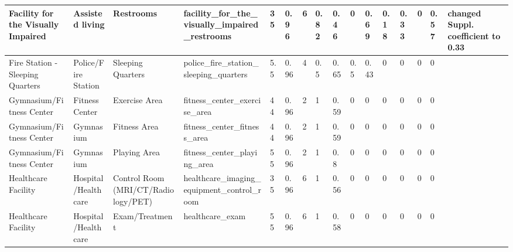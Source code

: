 \begin{center}
\begin{landscape}
\begin{longtable}{|p{0.75in}|p{0.75in}|p{0.75in}|p{0.75in}|p{0.3in}|p{0.3in}|p{0.3in}|p{0.3in}|p{0.3in}|p{0.3in}|p{0.3in}|p{0.3in}|p{0.3in}|p{0.3in}|p{0.3in}|p{0.6in}|}
      Facility for the Visually Impaired      & Assisted living             & Restrooms                                       & facility\_for\_the\_visually\_impaired\_restrooms               & 35   & 0.96 & 6  & 0.82   & 0.46  & 0     & 0.69  & 0.18 & 0.33 & 0    & 0.57 & changed Suppl. coefficient to 0.33                                              \\ \hline
      Fire Station - Sleeping Quarters        & Police/Fire Station         & Sleeping Quarters                               & police\_fire\_station\_sleeping\_quarters                       & 5.5  & 0.96 & 4  & 0.5    & 0.65  & 0.5   & 0.43  & 0    & 0    & 0    & 0    &                                                                                       \\ \hline
      Gymnasium/Fitness Center              & Fitness Center              & Exercise Area                                   & fitness\_center\_exercise\_area                                 & 44   & 0.96 & 2  & 1      & 0.59  & 0     & 0     & 0    & 0    & 0    & 0    &                                                                                       \\ \hline
      Gymnasium/Fitness Center              & Gymnasium                   & Fitness Area                                    & fitness\_center\_fitness\_area                                  & 44   & 0.96 & 2  & 1      & 0.59  & 0     & 0     & 0    & 0    & 0    & 0    &                                                                                       \\ \hline
      Gymnasium/Fitness Center              & Gymnasium                   & Playing Area                                    & fitness\_center\_playing\_area                                  & 55   & 0.96 & 2  & 1      & 0.8   & 0     & 0     & 0    & 0    & 0    & 0    &                                                                                       \\ \hline
      Healthcare Facility                     & Hospital/Healthcare         & Control Room (MRI/CT/Radiology/PET)       & healthcare\_imaging\_equipment\_control\_room                   & 35   & 0.96 & 6  & 1      & 0.56  & 0     & 0     & 0    & 0    & 0    & 0    &                                                                                       \\ \hline
      Healthcare Facility                     & Hospital/Healthcare         & Exam/Treatment                                  & healthcare\_exam                                                & 55   & 0.96 & 6  & 1      & 0.58  & 0     & 0     & 0    & 0    & 0    & 0    &                                                                                       \\ \hline

\end{longtable}
\end{landscape}
\end{center}
